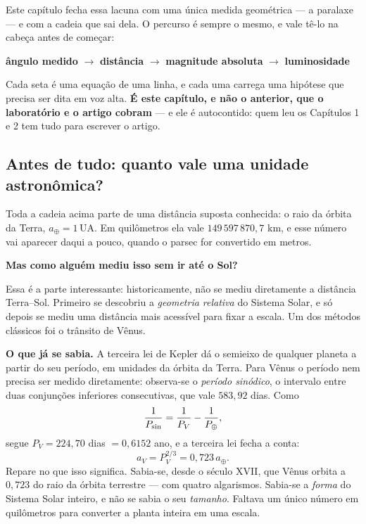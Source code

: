 \documentclass[11pt,a4paper]{article}
\begin{document}
Este capítulo fecha essa lacuna com uma única medida geométrica --- a paralaxe --- e com a cadeia que sai dela. O percurso é sempre o mesmo, e vale tê-lo na cabeça antes de começar:

\begin{center}
\textbf{ângulo medido} $\rightarrow$ \textbf{distância} $\rightarrow$ \textbf{magnitude absoluta} $\rightarrow$ \textbf{luminosidade}
\end{center}

Cada seta é uma equação de uma linha, e cada uma carrega uma hipótese que precisa ser dita em voz alta. \textbf{É este capítulo, e não o anterior, que o laboratório e o artigo cobram} --- e ele é autocontido: quem leu os Capítulos 1 e 2 tem tudo para escrever o artigo.

\subsection*{Antes de tudo: quanto vale uma unidade astronômica?}

Toda a cadeia acima parte de uma distância suposta conhecida: o raio da órbita da Terra, $a_\oplus=1\,\mathrm{UA}$. Em quilômetros ela vale $149\,597\,870{,}7$ km, e esse número vai aparecer daqui a pouco, quando o parsec for convertido em metros.

\textbf{Mas como alguém mediu isso sem ir até o Sol?}

Essa é a parte interessante: historicamente, não se mediu diretamente a distância Terra--Sol. Primeiro se descobriu a \emph{geometria relativa} do Sistema Solar, e só depois se mediu uma distância mais acessível para fixar a escala. Um dos métodos clássicos foi o trânsito de Vênus.

\textbf{O que já se sabia.} A terceira lei de Kepler dá o semieixo de qualquer planeta a partir do seu período, em unidades da órbita da Terra. Para Vênus o período nem precisa ser medido diretamente: observa-se o \emph{período sinódico}, o intervalo entre duas conjunções inferiores consecutivas, que vale $583{,}92$ dias. Como
\[
\frac{1}{P_{\rm sin}}=\frac{1}{P_V}-\frac{1}{P_\oplus},
\]
segue $P_V=224{,}70$ dias $=0{,}6152$ ano, e a terceira lei fecha a conta:
\[
a_V=P_V^{2/3}=0{,}723\,a_\oplus .
\]
Repare no que isso significa. Sabia-se, desde o século XVII, que Vênus orbita a $0{,}723$ do raio da órbita terrestre --- com quatro algarismos. Sabia-se a \emph{forma} do Sistema Solar inteiro, e não se sabia o seu \emph{tamanho}. Faltava um único número em quilômetros para converter a planta inteira em uma escala.
\end{document}
